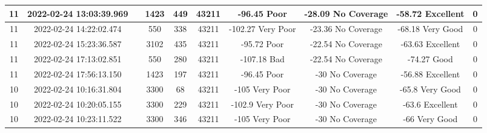 \begin{longtable*}{|c|c|c|c|c|c|c|c|c|c|}
11&2022-02-24 13:03:39.969&&1423&449&43211& -96.45    Poor        & -28.09    No Coverage & -58.72    Excellent   & 0\\\hline
{}11&2022-02-24 14:22:02.474&&550&338&43211& -102.27   Very Poor   & -23.36    No Coverage & -68.18    Very Good   & 0\\\hline
{}11&2022-02-24 15:23:36.587&&3102&435&43211& -95.72    Poor        & -22.54    No Coverage & -63.63    Excellent   & 0\\\hline
{}11&2022-02-24 17:13:02.851&&550&280&43211& -107.18   Bad         & -22.54    No Coverage & -74.27    Good        & 0\\\hline
{}11&2022-02-24 17:56:13.150&&1423&197&43211& -96.45    Poor        & -30       No Coverage & -56.88    Excellent   & 0\\\hline
{}10&2022-02-24 10:16:31.804&&3300&68&43211& -105      Very Poor   & -30       No Coverage & -65.8     Very Good   & 0\\\hline
{}10&2022-02-24 10:20:05.155&&3300&229&43211& -102.9    Very Poor   & -30       No Coverage & -63.6     Excellent   & 0\\\hline
{}10&2022-02-24 10:23:11.522&&3300&346&43211& -105      Very Poor   & -30       No Coverage & -66       Very Good   & 0\\\hline

\end{longtable*}
